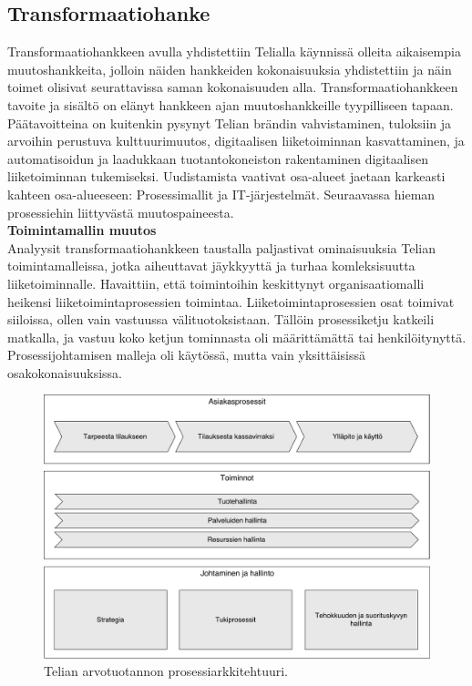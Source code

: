 \documentclass[finnish,12pt,a4paper,pdftex]{article}
\begin{document}
\subsection{Transformaatiohanke}

Transformaatiohankkeen avulla yhdistettiin Telialla käynnissä olleita aikaisempia muutoshankkeita, jolloin näiden hankkeiden kokonaisuuksia yhdistettiin ja näin toimet olisivat seurattavissa saman kokonaisuuden alla. Transformaatiohankkeen tavoite ja sisältö on elänyt hankkeen ajan muutoshankkeille tyypilliseen tapaan. Päätavoitteina on kuitenkin pysynyt Telian brändin vahvistaminen, tuloksiin ja arvoihin perustuva kulttuurimuutos, digitaalisen liiketoiminnan kasvattaminen, ja automatisoidun ja laadukkaan tuotantokoneiston rakentaminen digitaalisen liiketoiminnan tukemiseksi. Uudistamista vaativat osa-alueet jaetaan karkeasti kahteen osa-alueeseen: Prosessimallit ja IT-järjestelmät. Seuraavassa hieman prosessiehin liittyvästä muutospaineesta.\\

\textbf{Toimintamallin muutos}\\

Analyysit transformaatiohankkeen taustalla paljastivat ominaisuuksia Telian toimintamalleissa, jotka aiheuttavat jäykkyyttä ja turhaa komleksisuutta liiketoiminnalle. Havaittiin, että toimintoihin keskittynyt organisaatiomalli heikensi liiketoimintaprosessien toimintaa. Liiketoimintaprosessien osat toimivat siiloissa, ollen vain vastuussa välituotoksistaan. Tällöin prosessiketju katkeili matkalla, ja vastuu koko ketjun tominnasta oli määrittämättä tai henkilöitynyttä. Prosessijohtamisen malleja oli käytössä, mutta vain yksittäisissä osakokonaisuuksissa.\\

\begin{figure}[!h]
    \centering
    \includegraphics[scale=0.4]{images/prosessiarkkitehtuuri.pdf}
    \caption{Telian arvotuotannon prosessiarkkitehtuuri.}
    \label{fig:prosark}
\end{figure}
\end{document}
